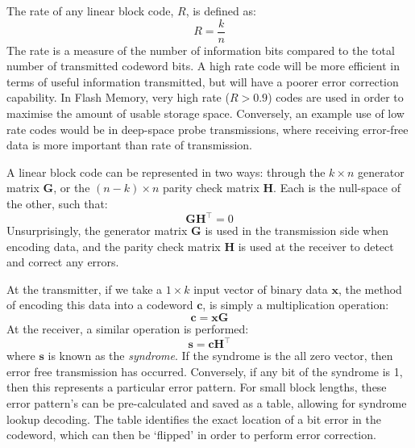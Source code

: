\documentclass[11pt]{article}
\numberwithin{equation}{subsection}
\begin{document}
The rate of any linear block code, $R$, is defined as: 
\begin{equation}
R = \dfrac{k}{n}
\end{equation}
The rate is a measure of the number of information bits compared to the total number of transmitted codeword bits. A high rate code will be more efficient in terms of useful information transmitted, but will have a poorer error correction capability. In Flash Memory, very high rate ($R > 0.9$) codes are used in order to maximise the amount of usable storage space. Conversely, an example use of low rate codes would be in deep-space probe transmissions, where receiving error-free data is more important than rate of transmission.

A linear block code can be represented in two ways: through the $k \times n$ generator matrix $\mathbf{G}$, or the $(n - k) \times n$ parity check matrix $\mathbf{H}$. Each is the null-space of the other, such that:
\begin{equation}
\mathbf{G H}^\top = 0
\end{equation}
Unsurprisingly, the generator matrix $\mathbf{G}$ is used in the transmission side when encoding data, and the parity check matrix $\mathbf{H}$ is used at the receiver to detect and correct any errors.

At the transmitter, if we take a $1 \times k$ input vector of binary data $\mathbf{x}$, the method of encoding this data into a codeword $\mathbf{c}$, is simply a multiplication operation:
\begin{equation}
\mathbf{c = xG}
\end{equation}
At the receiver, a similar operation is performed:
\begin{equation}
\mathbf{s = c H}^\top
\end{equation}
where $\mathbf{s}$ is known as the \textit{syndrome}. If the syndrome is the all zero vector, then error free transmission has occurred. Conversely, if any bit of the syndrome is 1, then this represents a particular error pattern. For small block lengths, these error pattern's can be pre-calculated and saved as a table, allowing for syndrome lookup decoding. The table identifies the exact location of a bit error in the codeword, which can then be `flipped' in order to perform error correction.
\end{document}
